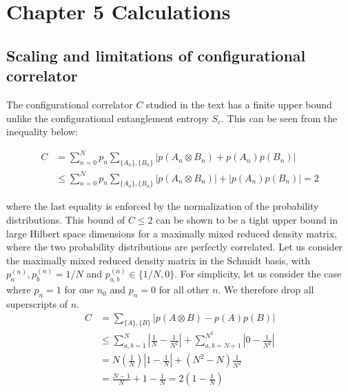 %

\chapter{Chapter 5 Calculations}
\label{appendix:Ch5Cal}

\newpage{}

\section{Scaling and limitations of configurational correlator}


The configurational correlator $C$ studied in the text has a finite upper bound unlike the configurational entanglement entropy $S_c$. This can be seen from the inequality below:

\begin{equation}
\begin{aligned}
C &= \sum_{n=0}^N p_n \sum_{\{A_n\},\{B_n\}} \left | p(A_{n} \otimes B_{n}) + p(A_{n}) p(B_{n}) \right |\\
 &\leq\sum_{n=0}^N p_n \sum_{\{A_n\},\{B_n\}} \left | p(A_{n} \otimes B_{n})\right | + \left | p(A_{n}) p(B_{n}) \right | = 2
\end{aligned}
\end{equation}

where the last equality is enforced by the normalization of the probability distributions. This bound of $C\leq2$ can be shown to be a tight upper bound in large Hilbert space dimensions for a maximally mixed reduced density matrix, where the two probability distributions are perfectly correlated. Let us consider the maximally mixed reduced density matrix in the Schmidt basis, with $p^{(n)}_a,p^{(n)}_b = 1/N$ and $p^{(n)}_{a,b} \in \{1/N, 0\}$. For simplicity, let us consider the case where $p_n=1$ for one $n_0$ and $p_n=0$ for all other $n$. We therefore drop all superscripts of $n$. 
\begin{equation}
\begin{aligned}
C &= \sum_{\{A\},\{B\}} \left| p(A\otimes B) - p(A) p(B) \right|  \\
&\leq \sum_{a,b = 1}^N \left |\frac{1}{N} - \frac{1}{N^2} \right | + \sum_{a,b = N+1}^{N^2} \left | 0 - \frac{1}{N^2} \right | \\ 
&= N \left (\frac{1}{N} \right ) \left | 1 - \frac{1}{N} \right | +\left ( N^2 - N \right ) \frac{1}{N^2} \\
&= \frac{N-1}{N} + 1 - \frac{1}{N} = 2 \left (1-\frac{1}{N} \right)
\end{aligned}
\end{equation}

